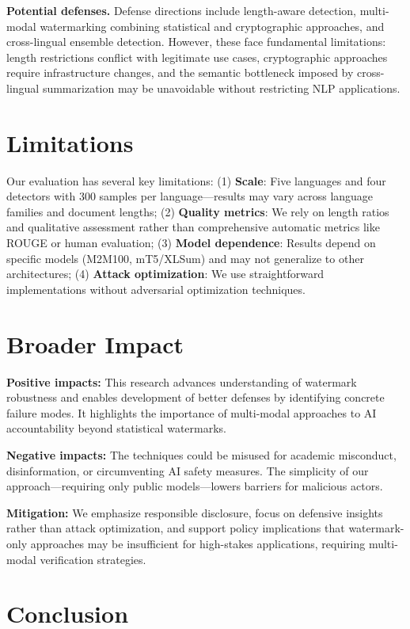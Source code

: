 \documentclass{article}
\begin{document}
\textbf{Potential defenses.}
Defense directions include length-aware detection, multi-modal watermarking combining statistical and cryptographic approaches, and cross-lingual ensemble detection. However, these face fundamental limitations: length restrictions conflict with legitimate use cases, cryptographic approaches require infrastructure changes, and the semantic bottleneck imposed by cross-lingual summarization may be unavoidable without restricting NLP applications.

\section{Limitations}

Our evaluation has several key limitations: (1) \textbf{Scale}: Five languages and four detectors with 300 samples per language—results may vary across language families and document lengths; (2) \textbf{Quality metrics}: We rely on length ratios and qualitative assessment rather than comprehensive automatic metrics like ROUGE or human evaluation; (3) \textbf{Model dependence}: Results depend on specific models (M2M100, mT5/XLSum) and may not generalize to other architectures; (4) \textbf{Attack optimization}: We use straightforward implementations without adversarial optimization techniques.

\section{Broader Impact}

\textbf{Positive impacts:} This research advances understanding of watermark robustness and enables development of better defenses by identifying concrete failure modes. It highlights the importance of multi-modal approaches to AI accountability beyond statistical watermarks.

\textbf{Negative impacts:} The techniques could be misused for academic misconduct, disinformation, or circumventing AI safety measures. The simplicity of our approach—requiring only public models—lowers barriers for malicious actors.

\textbf{Mitigation:} We emphasize responsible disclosure, focus on defensive insights rather than attack optimization, and support policy implications that watermark-only approaches may be insufficient for high-stakes applications, requiring multi-modal verification strategies.

\section{Conclusion}
\end{document}
